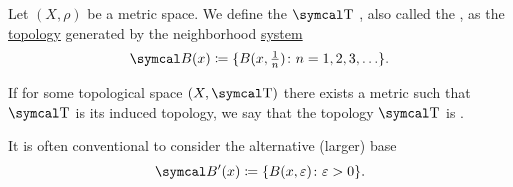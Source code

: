 \begin{definition}\label{def:metric_topology}\cite[249]{Engelking1989}
  Let \( (X, \rho) \) be a metric space. We define the \( \CT \) , also called the , as the \hyperref[def:topological_space]{topology} generated by the neighborhood \hyperref[def:topological_local_base]{system}
  \begin{equation}\label{def:metric_topology/integer_base}
    \Cal{B}(x) \coloneqq \{ B(x, \tfrac 1 n) \colon n = 1, 2, 3, \ldots \}.
  \end{equation}

  If for some topological space \( (X, \CT) \) there exists a metric such that \( \CT \) is its induced topology, we say that the topology \( \CT \) is .

  It is often conventional to consider the alternative (larger) base
  \begin{equation}\label{def:metric_topology/real_base}
    \Cal{B}'(x) \coloneqq \{ B(x, \varepsilon) \colon \varepsilon > 0 \}.
  \end{equation}
\end{definition}
